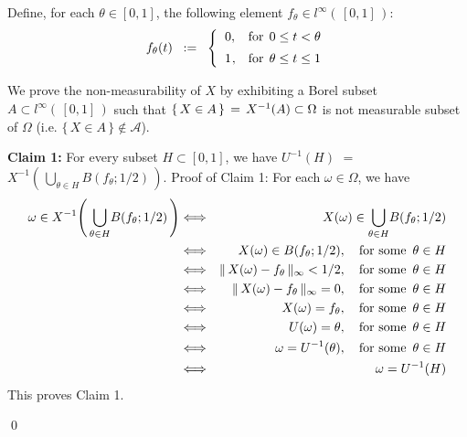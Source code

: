\proof
Define, for each $\theta \in [0,1]$, the following element $f_{\theta} \in l^{\infty}(\,[0,1]\,)$:
\begin{equation*}
f_{\theta}(t)
\;\; := \;\;
	\left\{\begin{array}{cc}
	0, & \textnormal{for} \;\, 0 \leq t < \theta
	\\
	\overset{{\color{white}+}}{1}, & \textnormal{for} \;\, \theta \leq t \leq 1
	\end{array}\right.
\end{equation*}

We prove the non-measurability of $X$ by exhibiting a Borel subset $A \subset l^{\infty}(\,[0,1]\,)$
such that $\{\,X \in A\,\} \,=\, X^{-1}(\overset{{\color{white}.}}{A}) \subset \Omega$ is not measurable
subset of $\Omega$ (i.e. $\{\,X \in A\,\} \notin \mathcal{A}$).

\vskip 0.5cm
\noindent
\textbf{Claim 1:}\;\;
For every subset $H \subset [0,1]$, we have
$U^{-1}(H)$ $=$ $X^{-1}\!\left(\,\underset{\theta\in H}{\bigcup}B(f_{\theta};1/2)\,\right)$.
\vskip 0.3cm
\noindent
Proof of Claim 1:\quad
For each $\omega \in \Omega$, we have
\begin{eqnarray*}
\omega \in X^{-1}\!\left(\,\underset{\theta\in H}{\bigcup}B(f_{\theta};1/2)\,\right)
&\Longleftrightarrow&
	X(\omega) \in \underset{\theta\in H}{\bigcup}B(f_{\theta};1/2)
\\
&\Longleftrightarrow&
	X(\omega) \in B(f_{\theta};1/2),
	\quad
	\textnormal{for some \,$\theta \in H$}
\\
&\Longleftrightarrow&
	\Vert\, X(\omega) - f_{\theta}\,\Vert_{\infty} < 1/2,
	\quad
	\textnormal{for some \,$\theta \in H$}
\\
&\Longleftrightarrow&
	\Vert\, X(\omega) - f_{\theta}\,\Vert_{\infty} = 0,
	\quad
	\textnormal{for some \,$\theta \in H$}
\\
&\Longleftrightarrow&
	X(\omega) = f_{\theta},
	\quad
	\textnormal{for some \,$\theta \in H$}
\\
&\Longleftrightarrow&
	U(\omega) = \theta,
	\quad
	\textnormal{for some \,$\theta \in H$}
\\
&\Longleftrightarrow&
	\omega = U^{-1}(\theta),
	\quad
	\textnormal{for some \,$\theta \in H$}
\\
&\Longleftrightarrow&
	\omega = U^{-1}(H)
\end{eqnarray*}
This proves Claim 1.

\qed



\renewcommand{\theenumi}{\roman{enumi}}
\renewcommand{\labelenumi}{\textnormal{(\theenumi)}$\;\;$}


